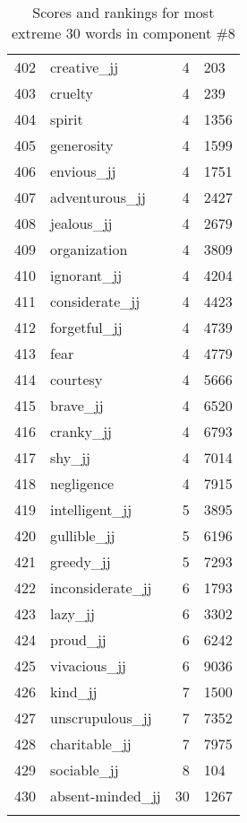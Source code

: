\begin{longtable}[!htbp]{| rlr@{.}l |}
    402 & creative\_jj & 4 & 203 \\
    403 & cruelty & 4 & 239 \\
    404 & spirit & 4 & 1356 \\
    405 & generosity & 4 & 1599 \\
    406 & envious\_jj & 4 & 1751 \\
    407 & adventurous\_jj & 4 & 2427 \\
    408 & jealous\_jj & 4 & 2679 \\
    409 & organization & 4 & 3809 \\
    410 & ignorant\_jj & 4 & 4204 \\
    411 & considerate\_jj & 4 & 4423 \\
    412 & forgetful\_jj & 4 & 4739 \\
    413 & fear & 4 & 4779 \\
    414 & courtesy & 4 & 5666 \\
    415 & brave\_jj & 4 & 6520 \\
    416 & cranky\_jj & 4 & 6793 \\
    417 & shy\_jj & 4 & 7014 \\
    418 & negligence & 4 & 7915 \\
    419 & intelligent\_jj & 5 & 3895 \\
    420 & gullible\_jj & 5 & 6196 \\
    421 & greedy\_jj & 5 & 7293 \\
    422 & inconsiderate\_jj & 6 & 1793 \\
    423 & lazy\_jj & 6 & 3302 \\
    424 & proud\_jj & 6 & 6242 \\
    425 & vivacious\_jj & 6 & 9036 \\
    426 & kind\_jj & 7 & 1500 \\
    427 & unscrupulous\_jj & 7 & 7352 \\
    428 & charitable\_jj & 7 & 7975 \\
    429 & sociable\_jj & 8 & 104 \\
    430 & absent-minded\_jj & 30 & 1267 \\
    \hline
    \caption{Scores and rankings for most extreme 30 words in component \#8} \\
\end{longtable}
